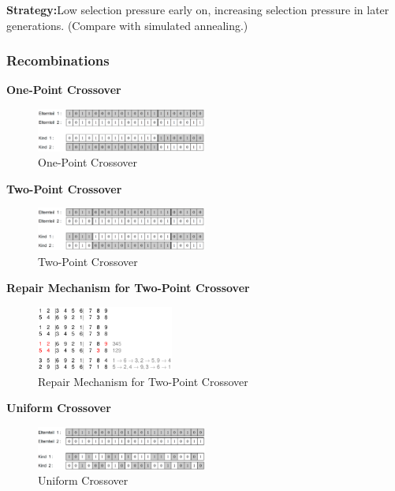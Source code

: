 \textbf{Strategy:}Low selection pressure early on, increasing selection
pressure in later generations. (Compare with simulated
annealing.)

\clearpage
\subsubsection{Recombinations}

\textbf{One-Point Crossover}
\begin{figure}[H]
\centering
\includegraphics[width=0.5\textwidth]{figures/onepointcrossover.png}
\caption{One-Point Crossover}
\end{figure}

\textbf{Two-Point Crossover}
\begin{figure}[H]
\centering
\includegraphics[width=0.5\textwidth]{figures/twopointcrossover.png}
\caption{Two-Point Crossover}
\end{figure}

\textbf{Repair Mechanism for Two-Point Crossover}
\begin{figure}[H]
\centering
\includegraphics[width=0.4\textwidth]{figures/repairtwopointcrossover.png}
\caption{Repair Mechanism for Two-Point Crossover}
\end{figure}

\textbf{Uniform Crossover}
\begin{figure}[H]
\centering
\includegraphics[width=0.5\textwidth]{figures/uniformcrossover.png}
\caption{Uniform Crossover}
\end{figure}

